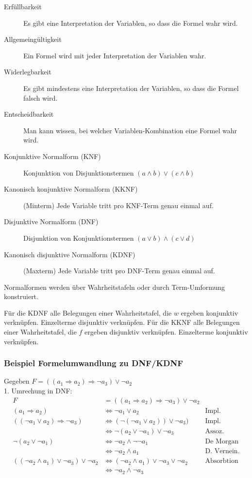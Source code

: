 \settowidth{\MyLenA}{Kanonisch konjunktive Normalform (KKNF)~~}
\begin{description}
	\item [Erfüllbarkeit] Es gibt eine Interpretation der Variablen, so dass die Formel wahr wird.
	\item [Allgemeingültigkeit] Ein Formel wird mit jeder Interpretation der Variablen wahr.
	\item [Widerlegbarkeit] Es gibt mindestens eine Interpretation der Variablen, so dass die Formel falsch wird.
	\item [Entscheidbarkeit] Man kann wissen, bei welcher Variablen-Kombination eine Formel wahr wird.
	\item [Konjunktive Normalform (KNF)] Konjunktion von Disjunktionstermen $(a \wedge b) \vee (c \wedge b)$
	\item [Kanonisch konjunktive Normalform (KKNF)] (Minterm) Jede Variable tritt pro KNF-Term genau einmal auf.
	\item [Disjunktive Normalform (DNF)] Disjunktion von Konjunktionstermen $(a \vee b) \wedge (c \vee d)$
	\item [Kanonisch disjunktive Normalform (KDNF)] (Maxterm) Jede Variable tritt pro DNF-Term genau einmal auf.\\	
\end{description}

Normalformen werden über Wahrheitstafeln oder durch Term-Umformung konstruiert.

Für die KDNF alle Belegungen einer Wahrheitstafel, die $w$ ergeben konjunktiv verknüpfen. Einzelterme disjunktiv verknüpfen.
Für die KKNF alle Belegungen einer Wahrheitstafel, die $f$ ergeben disjunktiv verknüpfen. Einzelterme konjunktiv verknüpfen.

\subsubsection{Beispiel Formelumwandlung zu DNF/KDNF}
Gegeben $F = ((a_1 \Rightarrow a_2) \Rightarrow \neg a_3) \vee \neg a_2$\\

1. Umrechung in DNF:\\
	\begin{align*}
		F& = ((a_1 \Rightarrow a_2) \Rightarrow \neg a_3) \vee \neg a_2\\
		(a_1 \Rightarrow a_2) & \Leftrightarrow \neg a_1 \vee a_2	& \mbox{Impl.}\\
		((\neg a_1 \vee a_2) \Rightarrow \neg a_3) & \Leftrightarrow (\neg (\neg a_1 \vee a_2)) \vee \neg a_3) & \mbox{Impl.}\\
		& \Leftrightarrow \neg(a_2 \vee \neg a_1) \vee \neg a_3 & \mbox{Assoz.}\\
		\neg(a_2 \vee \neg a_1) & \Leftrightarrow \neg a_2 \wedge \neg \neg a_1 & \mbox{De Morgan}\\
		& \Leftrightarrow \neg a_2 \wedge a_1 & \mbox {D. Vernein.}\\
		((\neg a_2 \wedge a_1) \vee \neg a_3) \vee \neg a_2 & \Leftrightarrow (\neg a_2 \wedge a_1) \vee \neg a_3 \vee \neg a_2 & \mbox{Absorbtion}\\
		& \Leftrightarrow \neg a_2 \wedge \neg a_3 
	\end{align*}


